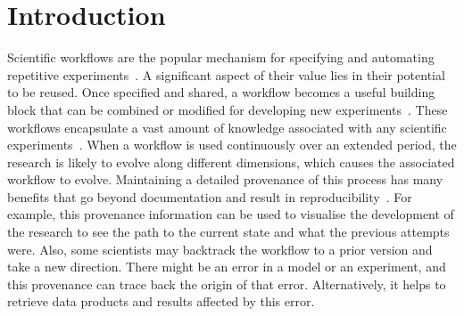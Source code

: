 \documentclass[ao]{iosart2x}
\begin{document}
\section{Introduction}

Scientific workflows are the popular mechanism for specifying and automating repetitive experiments~\citep{deelman2018future}. 
A significant aspect of their value lies in their potential to be reused. Once specified and shared, a workflow becomes a useful building block that can be combined or modified for developing new experiments~\citep{belhajjame2015using}. 
These workflows encapsulate a vast amount of knowledge associated with any scientific experiments~\citep{withana2010versioning}. 
When a workflow is used continuously over an extended period, the research is likely to evolve along different dimensions,
which causes the associated workflow to evolve. 
Maintaining a detailed provenance of this process has many benefits that go beyond documentation and result in reproducibility~\citep{anila_prov_2020}. 
For example, this provenance information can be used to visualise the development of the research to see the path to the current state and what the previous attempts were. 
Also, some scientists may backtrack the workflow to a prior version and take a new direction. There might be an error in a model or an experiment, and this provenance can trace back the origin of that error. Alternatively, it helps to retrieve data products and results affected by this error. %
\end{document}
